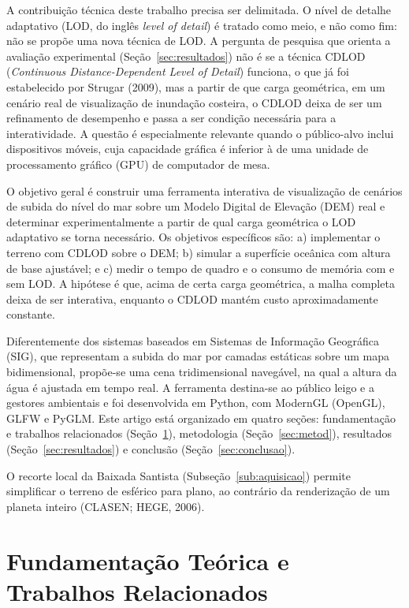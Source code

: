 \documentclass[conference]{IEEEtran}
\begin{document}
A contribuição técnica deste trabalho precisa ser delimitada. O nível de
detalhe adaptativo (LOD, do inglês \emph{level of detail}) é tratado como
meio, e não como fim: não se propõe uma nova técnica de LOD. A pergunta de
pesquisa que orienta a avaliação experimental (Seção~\ref{sec:resultados})
não é se a técnica CDLOD (\emph{Continuous Distance-Dependent Level of
Detail}) funciona, o que já foi estabelecido por Strugar (2009),
mas a partir de que carga geométrica, em um cenário real de visualização
de inundação costeira, o CDLOD deixa de ser um refinamento de desempenho e
passa a ser condição necessária para a interatividade. A questão é
especialmente relevante quando o público-alvo inclui dispositivos móveis,
cuja capacidade gráfica é inferior à de uma unidade de processamento
gráfico (GPU) de computador de mesa.

O objetivo geral é construir uma ferramenta interativa de visualização de
cenários de subida do nível do mar sobre um Modelo Digital de Elevação
(DEM) real e determinar experimentalmente a partir de qual carga geométrica
o LOD adaptativo se torna necessário. Os objetivos específicos são: a)
implementar o terreno com CDLOD sobre o DEM; b) simular a superfície
oceânica com altura de base ajustável; e c) medir o tempo de quadro e o
consumo de memória com e sem LOD. A hipótese é que, acima de certa carga geométrica, a malha completa deixa de ser interativa, enquanto o CDLOD mantém custo aproximadamente constante.

Diferentemente dos sistemas baseados em Sistemas de Informação Geográfica
(SIG), que representam a subida do mar por camadas estáticas sobre um mapa
bidimensional, propõe-se uma cena tridimensional navegável, na qual a altura
da água é ajustada em tempo real. A ferramenta destina-se ao público leigo e
a gestores ambientais e foi desenvolvida em Python, com ModernGL (OpenGL),
GLFW e PyGLM. Este artigo está organizado em quatro seções: fundamentação e
trabalhos relacionados (Seção~\ref{sec:fund}), metodologia
(Seção~\ref{sec:metod}), resultados (Seção~\ref{sec:resultados}) e
conclusão (Seção~\ref{sec:conclusao}).

O recorte local da Baixada Santista (Subseção~\ref{sub:aquisicao}) permite simplificar o terreno de esférico para plano, ao contrário da renderização de um planeta inteiro (CLASEN; HEGE, 2006).

\section{Fundamentação Teórica e Trabalhos Relacionados}
\label{sec:fund}
\end{document}

